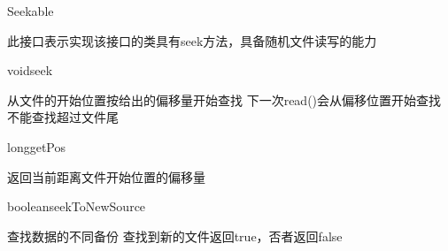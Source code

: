 \begin{XeClass}{Seekable}
   
 此接口表示实现该接口的类具有seek方法，具备随机文件读写的能力

  \begin{XeMethod}{}{void}{seek}
       
 从文件的开始位置按给出的偏移量开始查找
 下一次read()会从偏移位置开始查找
 不能查找超过文件尾

  \end{XeMethod}

  \begin{XeMethod}{}{long}{getPos}
       
 返回当前距离文件开始位置的偏移量

  \end{XeMethod}

  \begin{XeMethod}{}{boolean}{seekToNewSource}
       
 查找数据的不同备份
 查找到新的文件返回true，否者返回false

  \end{XeMethod}

\end{XeClass}
